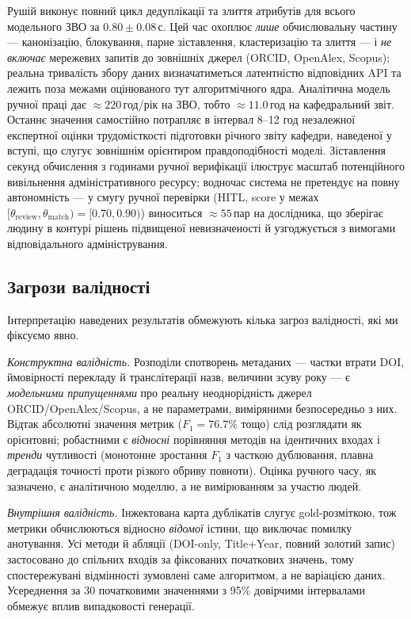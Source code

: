 Рушій виконує повний цикл дедуплікації та злиття атрибутів для всього модельного ЗВО за $0.80 \pm 0.08$\,с. Цей час охоплює \textit{лише} обчислювальну частину --- канонізацію, блокування, парне зіставлення, кластеризацію та злиття --- і \textit{не включає} мережевих запитів до зовнішніх джерел (ORCID, OpenAlex, Scopus); реальна тривалість збору даних визначатиметься латентністю відповідних API та лежить поза межами оцінюваного тут алгоритмічного ядра. Аналітична модель ручної праці дає $\approx 220$\,год/рік на ЗВО, тобто $\approx 11.0$\,год на кафедральний звіт. Останнє значення самостійно потрапляє в інтервал 8--12 год незалежної експертної оцінки трудомісткості підготовки річного звіту кафедри, наведеної у вступі, що слугує зовнішнім орієнтиром правдоподібності моделі. Зіставлення секунд обчислення з годинами ручної верифікації ілюструє масштаб потенційного вивільнення адміністративного ресурсу; водночас система не претендує на повну автономність --- у смугу ручної перевірки (HITL, score у межах $[\theta_{\text{review}}, \theta_{\text{match}}) = [0.70, 0.90)$) виноситься $\approx 55$\,пар на дослідника, що зберігає людину в контурі рішень підвищеної невизначеності й узгоджується з вимогами відповідального адміністрування.

\subsection*{Загрози валідності}

Інтерпретацію наведених результатів обмежують кілька загроз валідності, які ми фіксуємо явно.

\textit{Конструктна валідність.} Розподіли спотворень метаданих --- частки втрати DOI, ймовірності перекладу й транслітерації назв, величини зсуву року --- є \textit{модельними припущеннями} про реальну неоднорідність джерел ORCID/OpenAlex/Scopus, а не параметрами, виміряними безпосередньо з них. Відтак абсолютні значення метрик ($F_1 = 76.7\%$ тощо) слід розглядати як орієнтовні; робастними є \textit{відносні} порівняння методів на ідентичних входах і \textit{тренди} чутливості (монотонне зростання $F_1$ з часткою дублювання, плавна деградація точності проти різкого обриву повноти). Оцінка ручного часу, як зазначено, є аналітичною моделлю, а не вимірюванням за участю людей.

\textit{Внутрішня валідність.} Інжектована карта дублікатів слугує gold-розміткою, тож метрики обчислюються відносно \textit{відомої} істини, що виключає помилку анотування. Усі методи й абляції (DOI-only, Title+Year, повний золотий запис) застосовано до спільних входів за фіксованих початкових значень, тому спостережувані відмінності зумовлені саме алгоритмом, а не варіацією даних. Усереднення за 30 початковими значеннями з 95\% довірчими інтервалами обмежує вплив випадковості генерації.

